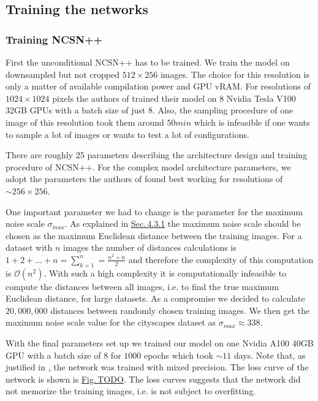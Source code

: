 \subsection{Training the networks} \label{sec:5.4.3}
\subsubsection{Training NCSN++}
First the unconditional NCSN++ has to be trained. We train the model on downsampled but not cropped $512\times256$ images. The choice for this resolution is only a matter of available compilation power and GPU vRAM. For resolutions of $1024\times1024$ pixels the authors of \cite{score_3} trained their model on $8$ Nvidia Tesla V100 32GB GPUs with a batch size of just $8$. Also, the sampling procedure of one image of this resolution took them around $50min$ which is infeasible if one wants to sample a lot of images or wants to test a lot of configurations. 

There are roughly $25$ parameters describing the architecture design and training procedure of NCSN++. For the complex model architecture parameters, we adopt the parameters the authors of \cite{score_3} found best working for resolutions of $\sim256\times256$. 

One important parameter we had to change is the parameter for the maximum noise scale $\sigma_{max}$. As explained in \hyperref[sec:4.3.1]{Sec.\,4.3.1} the maximum noise scale should be chosen as the maximum Euclidean distance between the training images. For a dataset with $n$ images the number of distances calculations is $1+2+\dots+n=\sum_{k=1}^n=\frac{n^2+n}{2}$ and therefore the complexity of this computation is $\mathcal{O}(n^2)$. With such a high complexity it is computationally infeasible to compute the distances between all images, i.e. to find the true maximum Euclidean distance, for large datasets. As a compromise we decided to calculate $20{,}000{,}000$ distances between randomly chosen training images. We then get the maximum noise scale value for the cityscapes dataset as $\sigma_{max}\approx338$.

With the final parameters set up we trained our model on one Nvidia A100 40GB GPU with a batch size of $8$ for $1000$ epochs which took $\sim11$ days. Note that, as justified in \hyperref[sec:5.3.1], the network was trained with mixed precision. The loss curve of the network is shown is \hyperref[fig:]{Fig.\,TODO}. The loss curves suggests that the network did not memorize the training images, i.e. is not subject to overfitting.

